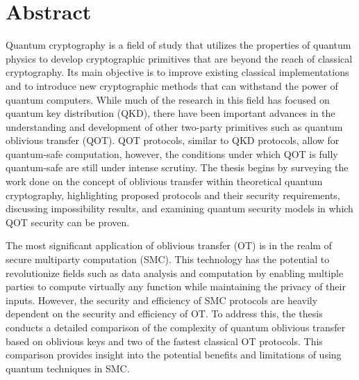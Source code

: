 
\chapter*{Abstract}

Quantum cryptography is a field of study that utilizes the properties of quantum physics to develop cryptographic primitives that are beyond the reach of classical cryptography. Its main objective is to improve existing classical implementations and to introduce new cryptographic methods that can withstand the power of quantum computers. While much of the research in this field has focused on quantum key distribution (QKD), there have been important advances in the understanding and development of other two-party primitives such as quantum oblivious transfer (QOT). QOT protocols, similar to QKD protocols, allow for quantum-safe computation, however, the conditions under which QOT is fully quantum-safe are still under intense scrutiny. The thesis begins by surveying the work done on the concept of oblivious transfer within theoretical quantum cryptography, highlighting proposed protocols and their security requirements, discussing impossibility results, and examining quantum security models in which QOT security can be proven.

The most significant application of oblivious transfer (OT) is in the realm of secure multiparty computation (SMC). This technology has the potential to revolutionize fields such as data analysis and computation by enabling multiple parties to compute virtually any function while maintaining the privacy of their inputs. However, the security and efficiency of SMC protocols are heavily dependent on the security and efficiency of OT. To address this, the thesis conducts a detailed comparison of the complexity of quantum oblivious transfer based on oblivious keys and two of the fastest classical OT protocols. This comparison provides insight into the potential benefits and limitations of using quantum techniques in SMC.

